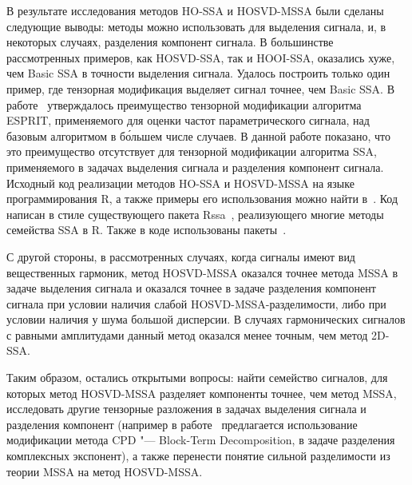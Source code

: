 \documentclass[specialist,
    substylefile=spbu.rtx,
    subf,href,colorlinks=true, 12pt]{disser}
\theoremstyle{plain}
\theoremstyle{definition}
\theoremstyle{remark}
\begin{document}
    В результате исследования методов HO-SSA и HOSVD-MSSA были сделаны следующие выводы:
    методы можно использовать для выделения сигнала, и, в некоторых случаях, разделения компонент сигнала.
    В большинстве рассмотренных примеров, как HOSVD-SSA, так и HOOI-SSA, оказались хуже,
    чем Basic SSA в точности выделения сигнала.
    Удалось построить только один пример, где тензорная модификация выделяет сигнал точнее, чем Basic SSA.
    В работе~\cite{hosvd-hooi-separation} утверждалось преимущество тензорной модификации алгоритма
    ESPRIT, применяемого для оценки частот параметрического сигнала, над базовым алгоритмом в б\'{о}льшем числе случаев.
    В данной работе показано, что это преимущество отсутствует для тензорной модификации алгоритма SSA, применяемого в задачах выделения сигнала и разделения компонент сигнала.
    Исходный код реализации методов HO-SSA и HOSVD-MSSA на языке программирования R, а также
    примеры его использования можно найти в~\cite{Rcode}.
    Код написан в стиле существующего пакета Rssa~\cite{Rssa-pack, Rssa}, реализующего многие методы семейства SSA в R.
    Также в коде использованы пакеты~\cite{rTensor-pack, tensr-pack, purrr-pack}.

    С другой стороны, в рассмотренных случаях, когда сигналы имеют вид вещественных гармоник, метод HOSVD-MSSA оказался
    точнее метода MSSA в задаче выделения сигнала и оказался точнее в задаче разделения компонент сигнала
    при условии наличия слабой HOSVD-MSSA-разделимости, либо при условии наличия у шума большой дисперсии.
    В случаях гармонических сигналов с равными амплитудами данный метод оказался менее точным, чем метод 2D-SSA.

    Таким образом, остались открытыми вопросы: найти семейство сигналов, для которых метод HOSVD-MSSA
    разделяет компоненты точнее, чем метод MSSA, исследовать другие тензорные разложения в задачах выделения сигнала
    и разделения компонент (например в работе~\cite{cpd-separation} предлагается использование модификации метода CPD
    "--- Block-Term Decomposition, в задаче разделения комплексных экспонент), а также
    перенести понятие сильной разделимости из теории MSSA на метод HOSVD-MSSA.

    
    
\end{document}
